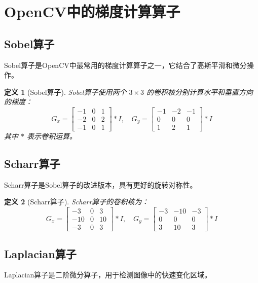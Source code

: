 \documentclass{article}
\newtheorem{definition}{定义}[section]
\begin{document}
\section{OpenCV中的梯度计算算子}

\subsection{Sobel算子}

Sobel算子是OpenCV中最常用的梯度计算算子之一，它结合了高斯平滑和微分操作。

\begin{definition}[Sobel算子]
Sobel算子使用两个 $3 \times 3$ 的卷积核分别计算水平和垂直方向的梯度：
\[
G_x = \begin{bmatrix}
-1 & 0 & 1 \\
-2 & 0 & 2 \\
-1 & 0 & 1
\end{bmatrix} * I, \quad
G_y = \begin{bmatrix}
-1 & -2 & -1 \\
0 & 0 & 0 \\
1 & 2 & 1
\end{bmatrix} * I
\]
其中 $*$ 表示卷积运算。
\end{definition}

\subsection{Scharr算子}

Scharr算子是Sobel算子的改进版本，具有更好的旋转对称性。

\begin{definition}[Scharr算子]
Scharr算子的卷积核为：
\[
G_x = \begin{bmatrix}
-3 & 0 & 3 \\
-10 & 0 & 10 \\
-3 & 0 & 3
\end{bmatrix} * I, \quad
G_y = \begin{bmatrix}
-3 & -10 & -3 \\
0 & 0 & 0 \\
3 & 10 & 3
\end{bmatrix} * I
\]
\end{definition}

\subsection{Laplacian算子}

Laplacian算子是二阶微分算子，用于检测图像中的快速变化区域。
\end{document}
